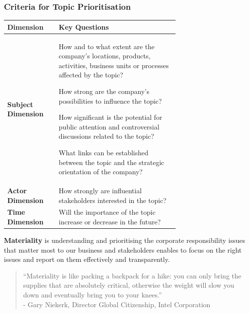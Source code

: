 \documentclass[11pt]{article}
\theoremstyle{definition}
\begin{document}
\subsubsection{Criteria for Topic Prioritisation}
\begin{tabularx}{\linewidth}{X p{0.7\linewidth}}
	\textbf{Dimension} & \textbf{Key Questions}\\
	\hline
	\textbf{Subject Dimension} & \begin{itemize}
		[
			left=0pt,
			nosep,
			before={\begin{minipage}[t]{\hsize}},
			after={\end{minipage}}
		]
		\item How and to what extent are the company's locations, products, activities, business units or processes affected by the topic?
		\item How strong are the company's possibilities to influence the topic?
		\item How significant is the potential for public attention and controversial discussions related to the topic?
		\item What links can be established between the topic and the strategic orientation of the company?
	\end{itemize}\\
	\textbf{Actor Dimension} & How strongly are influential stakeholders interested in the topic?\\
	\textbf{Time Dimension} & Will the importance of the topic increase or decrease in the future?
\end{tabularx}

\begin{definition}
	\textbf{Materiality} is understanding and prioritising the corporate responsibility issues that matter most to our business and stakeholders enables to focus on the right issues and report on them effectively and transparently.
\end{definition}

\noindent
\begin{quote}
	\textquotedblleft Materiality is like packing a backpack for a hike: you can only bring the supplies that are absolutely critical, otherwise the weight will slow you down and eventually bring you to your knees.\textquotedblright\\
	\hspace*{1em} - Gary Niekerk, Director Global Citizenship, Intel Corporation
\end{quote}
\end{document}

